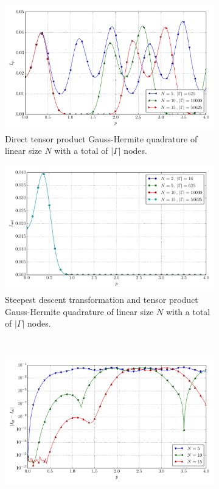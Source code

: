 \documentclass[a4paper,10pt]{article}
\begin{document}
\begin{figure}[ht!]
  \begin{subfigure}[t]{0.5\linewidth}
    \includegraphics[width=\linewidth]{./plots/tp_4d_conv_p_(1,1,1,1)_(1,1,1,1)_val_qr.pdf}
    \caption{Direct tensor product Gauss-Hermite quadrature of linear size $N$ with a total of $|\Gamma|$ nodes.}
    \label{fig:tp_4d_conv_p_1111_1111_val_qr}
  \end{subfigure}
  \begin{subfigure}[t]{0.5\linewidth}
    \includegraphics[width=\linewidth]{./plots/tp_4d_conv_p_(1,1,1,1)_(1,1,1,1)_val_nsd.pdf}
    \caption{Steepest descent transformation and tensor product Gauss-Hermite quadrature of linear size $N$ with a total of $|\Gamma|$ nodes.}
    \label{fig:tp_4d_conv_p_1111_1111_val_nsd}
  \end{subfigure} \\
  \begin{subfigure}[t]{0.5\linewidth}
    \includegraphics[width=\linewidth]{./plots/tp_4d_conv_p_(1,1,1,1)_(1,1,1,1)_err_qr.pdf}

\end{subfigure}
\end{figure}
\end{document}
